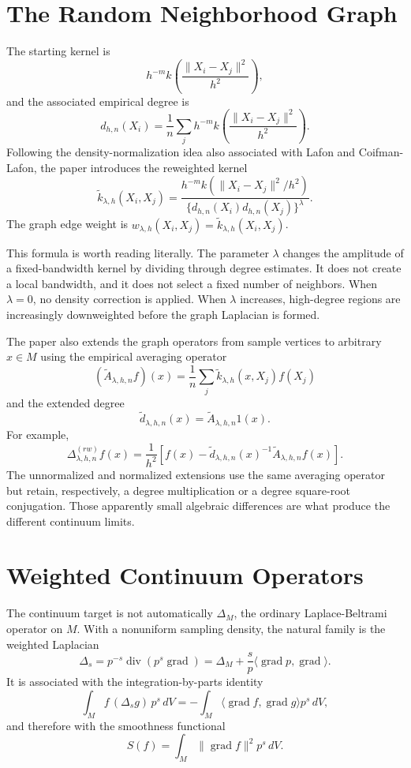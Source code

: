 \documentclass[11pt]{article}
\begin{document}
\section{The Random Neighborhood Graph}

The starting kernel is
\[
  h^{-m} k\!\left(\frac{\|X_i-X_j\|^2}{h^2}\right),
\]
and the associated empirical degree is
\[
  d_{h,n}(X_i)
  =
  \frac{1}{n}\sum_j h^{-m}
  k\!\left(\frac{\|X_i-X_j\|^2}{h^2}\right).
\]
Following the density-normalization idea also associated with Lafon and
Coifman-Lafon, the paper introduces the reweighted kernel
\[
  \widetilde{k}_{\lambda,h}(X_i,X_j)
  =
  \frac{
    h^{-m} k\!\left(\|X_i-X_j\|^2/h^2\right)
  }{
    \{d_{h,n}(X_i)d_{h,n}(X_j)\}^{\lambda}
  }.
\]
The graph edge weight is $w_{\lambda,h}(X_i,X_j)=
\widetilde{k}_{\lambda,h}(X_i,X_j)$.

This formula is worth reading literally.  The parameter $\lambda$ changes the
amplitude of a fixed-bandwidth kernel by dividing through degree estimates.
It does not create a local bandwidth, and it does not select a fixed number of
neighbors.  When $\lambda=0$, no density correction is applied.  When
$\lambda$ increases, high-degree regions are increasingly downweighted before
the graph Laplacian is formed.

The paper also extends the graph operators from sample vertices to arbitrary
$x \in M$ using the empirical averaging operator
\[
  (\widetilde{A}_{\lambda,h,n}f)(x)
  =
  \frac{1}{n}\sum_j \widetilde{k}_{\lambda,h}(x,X_j)f(X_j)
\]
and the extended degree
\[
  \widetilde{d}_{\lambda,h,n}(x)
  =
  \widetilde{A}_{\lambda,h,n}1(x).
\]
For example,
\[
  \Delta^{(rw)}_{\lambda,h,n} f(x)
  =
  \frac{1}{h^2}
  \left[
    f(x)
    -
    \widetilde{d}_{\lambda,h,n}(x)^{-1}
    \widetilde{A}_{\lambda,h,n}f(x)
  \right].
\]
The unnormalized and normalized extensions use the same averaging operator
but retain, respectively, a degree multiplication or a degree
square-root conjugation.  Those apparently small algebraic differences are
what produce the different continuum limits.

\section{Weighted Continuum Operators}

The continuum target is not automatically $\Delta_M$, the ordinary
Laplace-Beltrami operator on $M$.  With a nonuniform sampling density, the
natural family is the weighted Laplacian
\[
  \Delta_s
  =
  p^{-s}\operatorname{div}(p^s \operatorname{grad})
  =
  \Delta_M
  +
  \frac{s}{p}\langle \operatorname{grad}p,\operatorname{grad}\rangle .
\]
It is associated with the integration-by-parts identity
\[
  \int_M f\,(\Delta_s g)\,p^s\,dV
  =
  -\int_M
  \langle \operatorname{grad}f,\operatorname{grad}g\rangle
  p^s\,dV,
\]
and therefore with the smoothness functional
\[
  S(f) = \int_M \|\operatorname{grad}f\|^2 p^s\,dV.
\]
\end{document}
